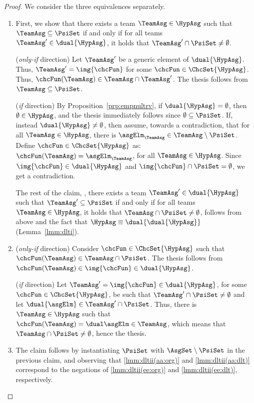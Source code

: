 \documentclass[authoryear]{elsarticle}
\newcommand{\EmpTeamAsg}{\emptyset}
\newcommand{\EmpHypAsg}{\emptyset}
\begin{document}
\lmmdltii*
%
\begin{proof}
  We consider the three equivalences separately.
  \begin{enumerate}[1)]
  \item First, we show that there exists a team $\TeamAsg \in \HypAsg$ such
    that $\TeamAsg \subseteq \PsiSet$ if and only if for all teams
    $\TeamAsg' \in \dual{\HypAsg}$, it holds that $\TeamAsg' \cap
    \PsiSet \neq \EmpTeamAsg$.

    (\emph{only-if} direction)
    Let $\TeamAsg'$ be a generic element of $\dual{\HypAsg}$.
    Thus, $\TeamAsg' = \img{\chcFun}$ for some $\chcFun \in
    \ChcSet{\HypAsg}$.
    Thus, $\chcFun(\TeamAsg) \in \TeamAsg \cap \TeamAsg'$.
    The thesis follows from $\TeamAsg \subseteq \PsiSet$.

    (\emph{if} direction) By Proposition~\ref{prp:empnultrv}, if $\dual{\HypAsg}
    = \EmpHypAsg$, then $\EmpTeamAsg \in \HypAsg$, and the thesis immediately
    follows since $\EmpTeamAsg \subseteq \PsiSet$.
    If, instead $\dual{\HypAsg} \neq \EmpHypAsg$, then assume, towards a
    contradiction, that for all $\TeamAsg \in \HypAsg$, there is
    $\asgElm_{\TeamAsg} \in \TeamAsg \setminus \PsiSet$.
    Define $\chcFun \in \ChcSet{\HypAsg}$ as: $\chcFun(\TeamAsg) =
    \asgElm_{\TeamAsg}$, for all $\TeamAsg \in \HypAsg$.
    Since $\img{\chcFun} \in \dual{\HypAsg}$ and $\img{\chcFun} \cap \PsiSet =
    \emptyset$, we get a contradiction.

    The rest of the claim, \ie, there exists a team $\TeamAsg' \in
    \dual{\HypAsg}$ such that $\TeamAsg' \subseteq \PsiSet$ if and only if
    for all teams $\TeamAsg \in \HypAsg$, it holds that $\TeamAsg \cap \PsiSet
    \neq \EmpTeamAsg$, follows from above and the fact that $\HypAsg \equiv
    \dual{\dual{\HypAsg}}$ (Lemma~\ref{lmm:dlti}).

  \item (\emph{only-if} direction) Consider $\chcFun \in \ChcSet{\HypAsg}$ such
    that $\chcFun(\TeamAsg) \in \TeamAsg \cap \PsiSet$.
    The thesis follows from $\chcFun(\TeamAsg) \in \img{\chcFun} \in
    \dual{\HypAsg}$.

    (\emph{if} direction) Let $\TeamAsg' = \img{\chcFun} \in
    \dual{\HypAsg}$, for some $\chcFun \in \ChcSet{\HypAsg}$, be such that
    $\TeamAsg' \cap \PsiSet \neq \EmpTeamAsg$ and let $\dual{\asgElm} \in
    \TeamAsg' \cap \PsiSet$.
    Thus, there is $\TeamAsg \in \HypAsg$ such that $\chcFun(\TeamAsg) =
    \dual\asgElm \in \TeamAsg$, which means that $\TeamAsg \cap \PsiSet \neq
    \EmpTeamAsg$, hence the thesis.

  \item The claim follows by instantiating $\PsiSet$ with $\AsgSet \setminus
    {\PsiSet}$ in the previous claim, and observing that \ref{lmm:dltii(aa:org)}
    and \ref{lmm:dltii(aa:dlt)} correspond to the negations of
    \ref{lmm:dltii(ee:org)} and \ref{lmm:dltii(ee:dlt)}, respectively.
%
    \qedhere
  \end{enumerate}
\end{proof}
\end{document}
